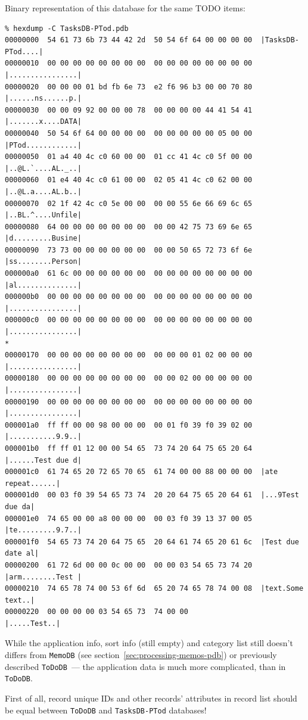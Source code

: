\documentclass[a4paper,12pt,oneside]{scrartcl}
\begin{document}
Binary representation of this database for the same TODO items:
\footnotesize
\begin{verbatim}
% hexdump -C TasksDB-PTod.pdb
00000000  54 61 73 6b 73 44 42 2d  50 54 6f 64 00 00 00 00  |TasksDB-PTod....|
00000010  00 00 00 00 00 00 00 00  00 00 00 00 00 00 00 00  |................|
00000020  00 00 00 01 bd fb 6e 73  e2 f6 96 b3 00 00 70 80  |......ns......p.|
00000030  00 00 09 92 00 00 00 78  00 00 00 00 44 41 54 41  |.......x....DATA|
00000040  50 54 6f 64 00 00 00 00  00 00 00 00 00 05 00 00  |PTod............|
00000050  01 a4 40 4c c0 60 00 00  01 cc 41 4c c0 5f 00 00  |..@L.`....AL._..|
00000060  01 e4 40 4c c0 61 00 00  02 05 41 4c c0 62 00 00  |..@L.a....AL.b..|
00000070  02 1f 42 4c c0 5e 00 00  00 00 55 6e 66 69 6c 65  |..BL.^....Unfile|
00000080  64 00 00 00 00 00 00 00  00 00 42 75 73 69 6e 65  |d.........Busine|
00000090  73 73 00 00 00 00 00 00  00 00 50 65 72 73 6f 6e  |ss........Person|
000000a0  61 6c 00 00 00 00 00 00  00 00 00 00 00 00 00 00  |al..............|
000000b0  00 00 00 00 00 00 00 00  00 00 00 00 00 00 00 00  |................|
000000c0  00 00 00 00 00 00 00 00  00 00 00 00 00 00 00 00  |................|
*
00000170  00 00 00 00 00 00 00 00  00 00 00 01 02 00 00 00  |................|
00000180  00 00 00 00 00 00 00 00  00 00 02 00 00 00 00 00  |................|
00000190  00 00 00 00 00 00 00 00  00 00 00 00 00 00 00 00  |................|
000001a0  ff ff 00 00 98 00 00 00  00 01 f0 39 f0 39 02 00  |...........9.9..|
000001b0  ff ff 01 12 00 00 54 65  73 74 20 64 75 65 20 64  |......Test due d|
000001c0  61 74 65 20 72 65 70 65  61 74 00 00 88 00 00 00  |ate repeat......|
000001d0  00 03 f0 39 54 65 73 74  20 20 64 75 65 20 64 61  |...9Test  due da|
000001e0  74 65 00 00 a8 00 00 00  00 03 f0 39 13 37 00 05  |te.........9.7..|
000001f0  54 65 73 74 20 64 75 65  20 64 61 74 65 20 61 6c  |Test due date al|
00000200  61 72 6d 00 00 0c 00 00  00 00 03 54 65 73 74 20  |arm........Test |
00000210  74 65 78 74 00 53 6f 6d  65 20 74 65 78 74 00 08  |text.Some text..|
00000220  00 00 00 00 03 54 65 73  74 00 00                 |.....Test..|
\end{verbatim}
\normalsize

While the application info, sort info (still empty) and category list still
doesn't differs from \texttt{MemoDB} (see
section~\ref{sec:processing-memos-pdb}) or previously described
\texttt{ToDoDB}~--- the application data is much more complicated, than in
\texttt{ToDoDB}.

First of all, record unique IDs and other records' attributes in record list
should be equal between \texttt{ToDoDB} and \texttt{TasksDB-PTod} databases!
\end{document}
